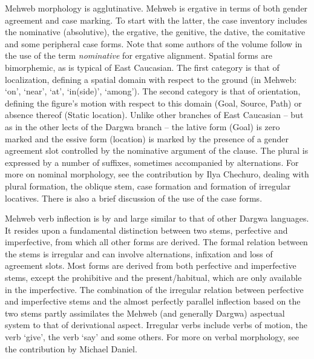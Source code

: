 \begin{refsection}
\largerpage

Mehweb morphology is agglutinative. Mehweb is ergative in terms of both gender
agreement and case marking. To start with the latter, the case inventory
includes the nominative (absolutive), the ergative, the genitive, the
dative, the comitative and some peripheral case forms. Note that some
authors of the volume follow \citet{kibrik1997} in the use of the term
\emph{nominative} for ergative alignment. Spatial forms are bimorphemic, as
is typical of East Caucasian. The first category is that of localization,
defining a spatial domain with respect to the ground (in Mehweb: `on',
`near', `at', `in(side)', `among'). The second category is that of
orientation, defining the figure's motion with respect to this domain
(Goal, Source, Path) or absence thereof (Static location). Unlike other
branches of East Caucasian – but as in the other lects of the
Dargwa branch – the lative form (Goal) is zero marked and the essive
form (location) is marked by the presence of a gender agreement slot
controlled by the nominative argument of the clause. The plural is expressed
by a number of suffixes, sometimes accompanied by alternations. For more
on nominal morphology, see the contribution by Ilya Chechuro, dealing
with plural formation, the oblique stem, case formation and formation of
irregular locatives. There is also a brief discussion of the use of the
case forms.

Mehweb verb inflection is by and large similar to that of other Dargwa
languages. It resides upon a fundamental distinction between two stems,
perfective and imperfective, from which all other forms are derived. The
formal relation between the stems is irregular and can involve
alternations, infixation and loss of agreement slots. Most
forms are derived from both perfective and imperfective stems, except
the prohibitive and the present/habitual, which are only available in the
imperfective. The combination of the irregular relation between perfective
and imperfective stems and the almost perfectly parallel inflection
based on the two stems partly assimilates the Mehweb (and generally
Dargwa) aspectual system to that of derivational aspect. Irregular verbs
include verbs of motion, the verb `give', the verb `say' and some others.
For more on verbal morphology, see the contribution by Michael Daniel.

\largerpage


\end{refsection}
